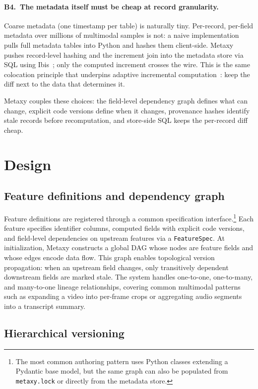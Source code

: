 \documentclass[sigconf]{acmart}
\begin{document}
\paragraph{B4.~The metadata itself must be cheap at record granularity.}
Coarse metadata (one timestamp per table) is naturally tiny.
Per-record, per-field metadata over millions of multimodal samples is not: a naive implementation pulls full metadata tables into Python and hashes them client-side.
Metaxy pushes record-level hashing and the increment join into the metadata store via SQL using Ibis~\cite{ibis}; only the computed increment crosses the wire.
This is the same colocation principle that underpins adaptive incremental computation~\cite{acar2006adaptive}: keep the diff next to the data that determines it.

Metaxy couples these choices: the field-level dependency graph defines what can change, explicit code versions define when it changes, provenance hashes identify stale records before recomputation, and store-side SQL keeps the per-record diff cheap.

\section{Design}

\subsection{Feature definitions and dependency graph}

Feature definitions are registered through a common specification interface.\footnote{The most common authoring pattern uses Python classes extending a Pydantic base model, but the same graph can also be populated from \texttt{metaxy.lock} or directly from the metadata store.}
Each feature specifies identifier columns, computed fields with explicit code versions, and field-level dependencies on upstream features via a \texttt{FeatureSpec}.
At initialization, Metaxy constructs a global DAG whose nodes are feature fields and whose edges encode data flow.
This graph enables topological version propagation: when an upstream field changes, only transitively dependent downstream fields are marked stale.
The system handles one-to-one, one-to-many, and many-to-one lineage relationships, covering common multimodal patterns such as expanding a video into per-frame crops or aggregating audio segments into a transcript summary.

\subsection{Hierarchical versioning}
\end{document}
